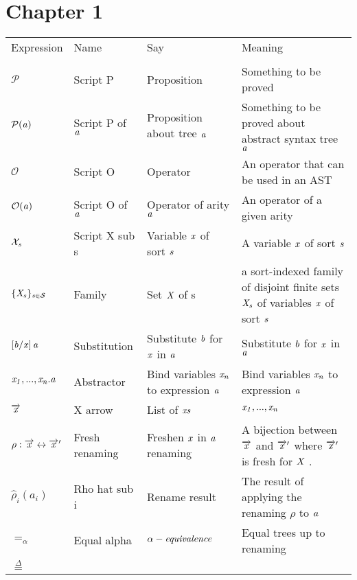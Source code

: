 \documentclass[12pt]{article}
\begin{document}
\section*{Chapter 1}
\begin{tabular}[b] {p{} p{} p{} p{}}
Expression & Name & Say & Meaning \\ \\
$\mathcal{P}$ & Script P & Proposition & Something to be proved \\
$\mathcal{P}(\it{a})$ & Script P of $\it{a}$ & Proposition about tree $\it{a}$ & Something to be proved about abstract syntax tree $\it{a}$ \\
$\mathcal{O}$ & Script O & Operator & An operator that can be used in an AST \\
$\mathcal{O}(\it{a})$ & Script O of $\it{a}$ & Operator of arity $\it{a}$ & An operator of a given arity \\
$\mathcal{X}_{\it{s}}$ & Script X sub s & Variable $\it{x}$ of sort $\it{s}$ & A variable $\it{x}$ of sort $\it{s}$ \\
$\{ \it{X}_{s} \} _{\it{s} \in \mathcal{S}}$  & Family & Set $ \it{X} $ of s & a sort-indexed family of disjoint finite sets $ \it{X}_s $ of variables $\it{x}$ of sort $ \it{s} $ \\
$\left[ \it{b} / \it{x}\right] \it{a}$ & Substitution & Substitute $\it{b}$ for $\it{x}$ in $\it{a}$ & Substitute $\it{b}$ for $\it{x}$ in $\it{a}$ \\
$ \it{x}_1, ... ,\it{x}_{\it{n}}.\it{a} $ & Abstractor & Bind variables $\it{x_n}$ to expression $\it{a}$ & Bind variables $\it{x_n}$ to expression $\it{a}$ \\
$ \overrightarrow{\it{x}} $ & X arrow & List of $\it{x}s$ & $ \it{x}_1, ... ,\it{x}_{\it{n}} $ \\
$ \rho : \overrightarrow{\it{x}} \leftrightarrow \overrightarrow{\it{x}}'$ & Fresh renaming & Freshen $ \it{x} $ in $ \it{a} $ renaming & A bijection between $ \overrightarrow{\it{x}} $ and $ \overrightarrow{\it{x}}' $ where $ \overrightarrow{\it{x}}'$ is fresh for $\it{X}$ . \\
$\widehat{\rho}_i (a_i)$ & Rho hat sub i & Rename result & The result of applying the renaming $ \rho $ to $ \it{a} $ \\
$ =_\alpha $ & Equal alpha & $ \it{\alpha-equivalence} $ & Equal trees up to renaming \\
$ \overset{\Delta}{=} $ & & & \\
\end{tabular}
\end{document}
